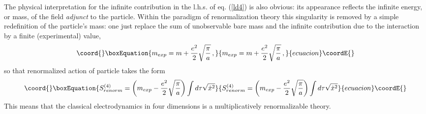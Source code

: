 \documentclass[a4paper,12pt]{article}
\begin{document}
The physical interpretation for the infinite contribution in the l.h.s. of
eq. (\ref{ld4}) is also obvious: its appearance reflects the infinite
energy, or mass, of the field {\it adjunct} to the particle. Within the
paradigm of renormalization theory this singularity is removed by a simple
redefinition of the particle's mass: one just replace the sum of
unobservable bare mass \coordHE{} and the infinite contribution due to the
interaction by a finite (experimental) value,
\begin{equation}\coord{}\boxEquation{
m_{exp}=m+\frac{e^2}{2}\sqrt{\frac{\pi}{a}}\,,
}{
m_{exp}=m+\frac{e^2}{2}\sqrt{\frac{\pi}{a}}\,,
}{ecuacion}\coordE{}\end{equation}
so that renormalized action of \coordHE{} particle takes the form
\begin{equation}\coord{}\boxEquation{  \label{d4}
S^{(4)}_{renorm}=\left( m_{exp}-\frac{e^2}{2}\sqrt{\frac{\pi}{a}}\right)\int
d\tau\sqrt{\dot{x}^2}
}{  S^{(4)}_{renorm}=\left( m_{exp}-\frac{e^2}{2}\sqrt{\frac{\pi}{a}}\right)\int
d\tau\sqrt{\dot{x}^2}
}{ecuacion}\coordE{}\end{equation}
This means that the classical electrodynamics in four dimensions is a
multiplicatively renormalizable theory.
\end{document}
